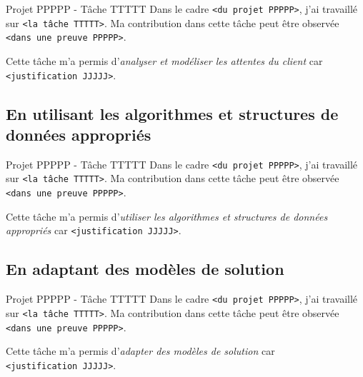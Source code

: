 \documentclass[%
    10pt,%
    usenames,%
    dvipsnames%
]{beamer}
\begin{document}
\begin{frame}[fragile]{Projet PPPPP - Tâche TTTTT}
\label{projet-ppppp---tuxe2che-ttttt-4}
Dans le cadre \texttt{\textless{}du\ projet\ PPPPP\textgreater{}}, j'ai
travaillé sur \texttt{\textless{}la\ tâche\ TTTTT\textgreater{}}. Ma
contribution dans cette tâche peut être observée
\texttt{\textless{}dans\ une\ preuve\ PPPPP\textgreater{}}.

Cette tâche m'a permis d'\emph{analyser et modéliser les attentes du
client} car \texttt{\textless{}justification\ JJJJJ\textgreater{}}.
\end{frame}

\subsection{En utilisant les algorithmes et structures de données
appropriés}\label{en-utilisant-les-algorithmes-et-structures-de-donnuxe9es-appropriuxe9s}

\begin{frame}[fragile]{Projet PPPPP - Tâche TTTTT}
\label{projet-ppppp---tuxe2che-ttttt-5}
Dans le cadre \texttt{\textless{}du\ projet\ PPPPP\textgreater{}}, j'ai
travaillé sur \texttt{\textless{}la\ tâche\ TTTTT\textgreater{}}. Ma
contribution dans cette tâche peut être observée
\texttt{\textless{}dans\ une\ preuve\ PPPPP\textgreater{}}.

Cette tâche m'a permis d'\emph{utiliser les algorithmes et structures de
données appropriés} car
\texttt{\textless{}justification\ JJJJJ\textgreater{}}.
\end{frame}

\subsection{En adaptant des modèles de
solution}\label{en-adaptant-des-moduxe8les-de-solution}

\begin{frame}[fragile]{Projet PPPPP - Tâche TTTTT}
\label{projet-ppppp---tuxe2che-ttttt-6}
Dans le cadre \texttt{\textless{}du\ projet\ PPPPP\textgreater{}}, j'ai
travaillé sur \texttt{\textless{}la\ tâche\ TTTTT\textgreater{}}. Ma
contribution dans cette tâche peut être observée
\texttt{\textless{}dans\ une\ preuve\ PPPPP\textgreater{}}.

Cette tâche m'a permis d'\emph{adapter des modèles de solution} car
\texttt{\textless{}justification\ JJJJJ\textgreater{}}.
\end{frame}
\end{document}
